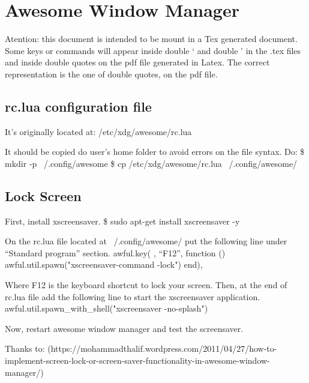 \section{Awesome Window Manager}
\label{cap_awesome_wm}
Atention: this document is intended to be mount in a Tex generated document. Some keys or commands will appear inside double ` and double ' in the .tex files and inside double quotes on the pdf file generated in Latex. The correct representation is the one of double quotes, on the pdf file.

\subsection{rc.lua configuration file}
It's originally located at:
	/etc/xdg/awesome/rc.lua

It should be copied do user's home folder to avoid errors on the file syntax. Do:
	\$ mkdir -p ~/.config/awesome
	\$ cp /etc/xdg/awesome/rc.lua ~/.config/awesome/

\subsection{Lock Screen}
First, install xscreensaver.
	\$ sudo apt-get install xscreensaver -y

On the rc.lua file located at ~/.config/awesome/ put the following line under “Standard program” section.
	awful.key({ }, ``F12'', function () awful.util.spawn("xscreensaver-command -lock") end),

Where F12 is the keyboard shortcut to lock your screen. Then, at the end of rc.lua file add the following line to start the xscreensaver application.
	awful.util.spawn_with_shell("xscreensaver -no-splash")

Now, restart awesome window manager and test the screensaver.

Thanks to: (https://mohammadthalif.wordpress.com/2011/04/27/how-to-implement-screen-lock-or-screen-saver-functionality-in-awesome-window-manager/)
